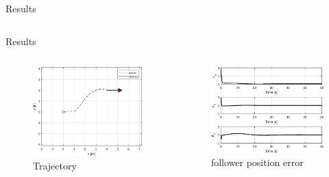 \documentclass{beamer}
\begin{document}
\begin{frame}{Results}
\begin{columns}
\begin{column}{0.5\textwidth}
\end{column}

\end{columns}
\end{frame}  

\begin{frame}{Results}
\begin{columns}
\begin{column}{0.5\textwidth}
\begin{figure}
\includegraphics[scale=0.4]{figs/matlab/gradientDescent/straightLine/trajectory.eps}
\caption{Trajectory}
\end{figure}
\end{column}

\begin{column}{0.5\textwidth}
\begin{center}

\begin{figure}
\includegraphics[scale=0.4]{figs/matlab/gradientDescent/straightLine/error.eps}
\caption{follower position error}
\end{figure}
\end{center}


\end{column}
\end{columns}
\end{frame}
\end{document}
